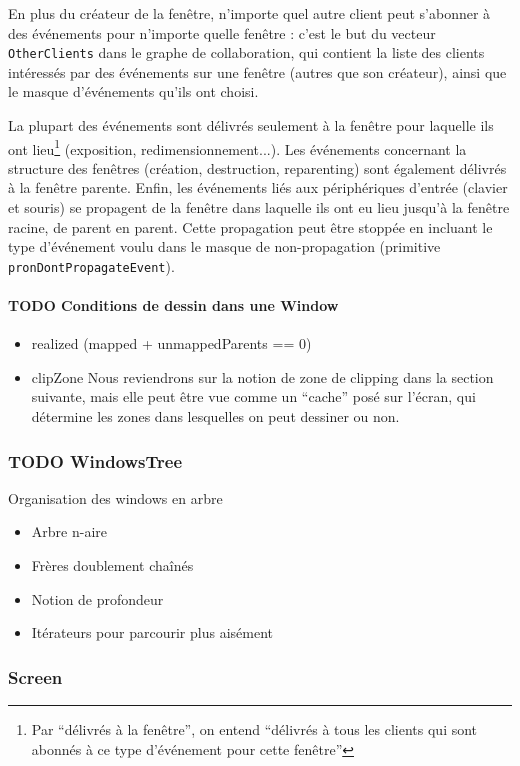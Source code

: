 En plus du créateur de la fenêtre, n'importe quel autre client peut s'abonner à des événements pour n'importe quelle fenêtre : c'est le but du vecteur \verb|OtherClients| dans le graphe de collaboration, qui contient la liste des clients intéressés par des événements sur une fenêtre (autres que son créateur), ainsi que le masque d'événements qu'ils ont choisi.

La plupart des événements sont délivrés seulement à la fenêtre pour laquelle ils ont lieu\footnote{Par ``délivrés à la fenêtre'', on entend ``délivrés à tous les clients qui sont abonnés à ce type d'événement pour cette fenêtre''} (exposition, redimensionnement...). Les événements concernant la structure des fenêtres (création, destruction, reparenting) sont également délivrés à la fenêtre parente. Enfin, les événements liés aux périphériques d'entrée (clavier et souris) se propagent de la fenêtre dans laquelle ils ont eu lieu jusqu'à la fenêtre racine, de parent en parent. Cette propagation peut être stoppée en incluant le type d'événement voulu dans le masque de non-propagation (primitive \verb|pronDontPropagateEvent|).

\paragraph{TODO Conditions de dessin dans une Window}
\begin{itemize}
  \item realized (mapped + unmappedParents == 0)
  \item clipZone Nous reviendrons sur la notion de zone de clipping dans la section suivante, mais elle peut être vue comme un ``cache'' posé sur l'écran, qui détermine les zones dans lesquelles on peut dessiner ou non.
\end{itemize}

\subsubsection{TODO WindowsTree}
Organisation des windows en arbre
\begin{itemize}
  \item Arbre n-aire
  \item Frères doublement chaînés
  \item Notion de profondeur
  \item Itérateurs pour parcourir plus aisément
\end{itemize}

\subsubsection{Screen}

